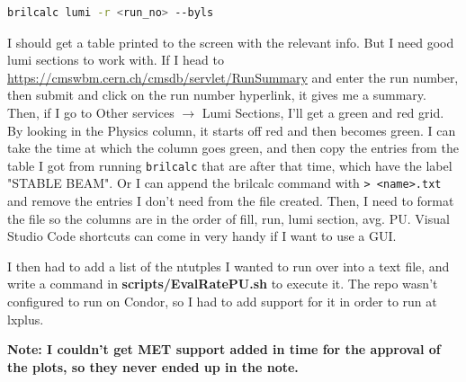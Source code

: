 \begin{lstlisting}[belowskip=-0.7cm, language=sh, numbers=none]
brilcalc lumi -r <run_no> --byls
\end{lstlisting}

I should get a table printed to the screen with the relevant info. But I need good lumi sections to work with. If I head to \url{https://cmswbm.cern.ch/cmsdb/servlet/RunSummary} and enter the run number, then submit and click on the run number hyperlink, it gives me a summary. Then, if I go to Other services $\rightarrow$ Lumi Sections, I'll get a green and red grid. By looking in the Physics column, it starts off red and then becomes green. I can take the time at which the column goes green, and then copy the entries from the table I got from running \texttt{brilcalc} that are after that time, which have the label "STABLE BEAM". Or I can append the brilcalc command with \texttt{> <name>.txt} and remove the entries I don't need from the file created. Then, I need to format the file so the columns are in the order of fill, run, lumi section, avg. PU. Visual Studio Code shortcuts can come in very handy if I want to use a GUI.

I then had to add a list of the ntutples I wanted to run over into a text file, and write a command in \textbf{scripts/EvalRatePU.sh} to execute it. The repo wasn't configured to run on Condor, so I had to add support for it in order to run at lxplus.

\textbf{Note: I couldn't get MET support added in time for the approval of the plots, so they never ended up in the note.}



